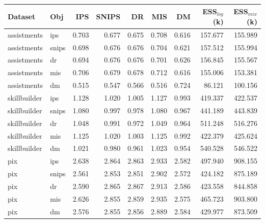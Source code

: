 \begin{tabular}{llrrrrrrr}
\toprule
Dataset & Obj & IPS & SNIPS & DR & MIS & DM & ESS$_{log}$ (k) & ESS$_{mix}$ (k) \\
\midrule
assistments & ips & 0.703 & 0.677 & 0.675 & 0.708 & 0.616 & 157.677 & 155.989 \\
assistments & snips & 0.698 & 0.676 & 0.676 & 0.704 & 0.621 & 157.512 & 155.994 \\
assistments & dr & 0.694 & 0.676 & 0.676 & 0.701 & 0.626 & 156.845 & 155.567 \\
assistments & mis & 0.706 & 0.679 & 0.678 & 0.712 & 0.616 & 155.006 & 153.381 \\
assistments & dm & 0.515 & 0.547 & 0.566 & 0.516 & 0.724 & 86.121 & 100.156 \\
skillbuilder & ips & 1.128 & 1.020 & 1.005 & 1.127 & 0.993 & 419.337 & 422.537 \\
skillbuilder & snips & 1.080 & 0.997 & 0.978 & 1.080 & 0.967 & 441.189 & 443.839 \\
skillbuilder & dr & 1.048 & 0.991 & 0.972 & 1.049 & 0.964 & 511.248 & 516.276 \\
skillbuilder & mis & 1.125 & 1.020 & 1.003 & 1.125 & 0.992 & 422.379 & 425.624 \\
skillbuilder & dm & 1.021 & 0.980 & 0.961 & 1.023 & 0.954 & 540.528 & 546.522 \\
pix & ips & 2.638 & 2.864 & 2.863 & 2.933 & 2.582 & 497.940 & 908.155 \\
pix & snips & 2.561 & 2.853 & 2.851 & 2.902 & 2.572 & 424.182 & 875.189 \\
pix & dr & 2.590 & 2.865 & 2.867 & 2.913 & 2.586 & 423.558 & 844.858 \\
pix & mis & 2.626 & 2.855 & 2.859 & 2.935 & 2.575 & 465.723 & 903.800 \\
pix & dm & 2.576 & 2.855 & 2.856 & 2.889 & 2.584 & 429.977 & 873.509 \\
\bottomrule
\end{tabular}
